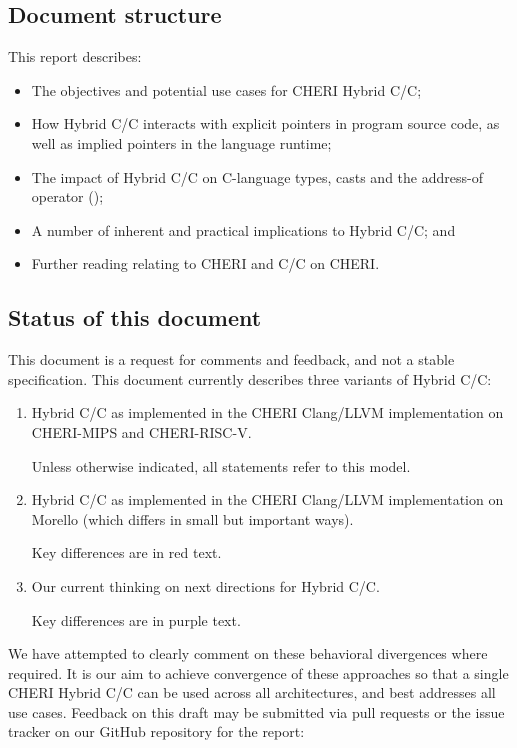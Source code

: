 \documentclass[12pt,twoside,openright,a4paper]{article}
\newcommand{\ccode}[1]{{\small\ttfamily{#1}}}
\newcommand{\futurevariant}[1]{{\color{purple} #1}}
\newcommand{\morellovariant}[1]{{\color{red} #1}}
\newcommand*{\cpp}{\texorpdfstring{C\textsmaller[2]{\protect\nolinebreak[4]\hspace{-.05em}\raisebox{.45ex}{\textbf{++}}}}{C++}}
\newcommand*{\COrCpp}{C/\cpp{}}
\newcommand*{\CHERIhybridCOrCpp}{CHERI Hybrid \COrCpp{}}
\newcommand*{\hybridCOrCpp}{Hybrid \COrCpp{}}
\begin{document}
\subsection{Document structure}

This report describes:

\begin{itemize}
\item The objectives and potential use cases for \CHERIhybridCOrCpp{};
\item How \hybridCOrCpp{} interacts with explicit pointers in program source
  code, as well as implied pointers in the language runtime;
\item The impact of \hybridCOrCpp{} on C-language types, casts and the address-of operator
  (\ccode{\&});
\item A number of inherent and practical implications to \hybridCOrCpp{}; and
\item Further reading relating to CHERI and \COrCpp{} on CHERI.
\end{itemize}

\subsection{Status of this document}

This document is a request for comments and feedback, and not a stable
specification.
This document currently describes three variants of \hybridCOrCpp{}:

\begin{enumerate}
\item \hybridCOrCpp{} as implemented in the CHERI Clang/LLVM implementation on
  CHERI-MIPS and CHERI-RISC-V.

  Unless otherwise indicated, all statements refer to this model.

\item \hybridCOrCpp{} as implemented in the CHERI Clang/LLVM implementation on
  Morello (which differs in small but important ways).

  Key differences are in \morellovariant{red text}.

\item Our current thinking on next directions for \hybridCOrCpp{}.

  Key differences are in \futurevariant{purple text}.
\end{enumerate}

\noindent
We have attempted to clearly comment on these behavioral divergences where
required.
It is our aim to achieve convergence of these approaches so that a single
\CHERIhybridCOrCpp{} can be used across all architectures, and best addresses
all use cases.
Feedback on this draft may be submitted via pull requests or the issue tracker
on our GitHub repository for the report:
\end{document}
